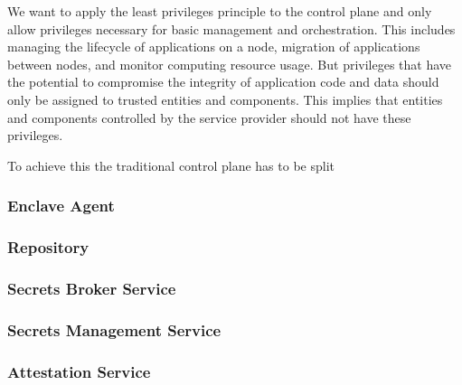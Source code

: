 We want to apply the least privileges principle to the control plane and only
allow privileges necessary for basic management and orchestration. This includes
managing the lifecycle of applications on a node, migration of applications
between nodes, and monitor computing resource usage. But privileges that have
the potential to compromise the integrity of application code and data should
only be assigned to trusted entities and components. This implies that entities
and components controlled by the service provider should not have these
privileges.

To achieve this the traditional control plane has to be split

\subsubsection{Enclave Agent}

\subsubsection{Repository}

\subsubsection{Secrets Broker Service}

\subsubsection{Secrets Management Service}

\subsubsection{Attestation Service}
